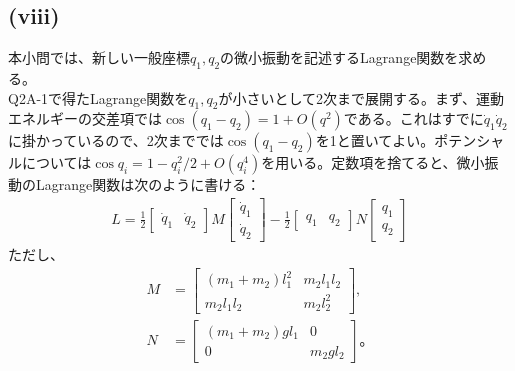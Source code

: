   \subsection*{(viii)}
  本小問では、新しい一般座標$q_1,q_2$の微小振動を記述するLagrange関数を求める。\\
  Q2A-1で得たLagrange関数を$q_1,q_2$が小さいとして2次まで展開する。まず、運動エネルギーの交差項では$\cos(q_1-q_2)=1+O(q^2)$である。これはすでに$\dot{q}_1\dot{q}_2$に掛かっているので、2次まででは$\cos(q_1-q_2)$を1と置いてよい。ポテンシャルについては$\cos q_i=1-q_i^2/2+O(q_i^4)$を用いる。定数項を捨てると、微小振動のLagrange関数は次のように書ける：
  \begin{align*}
    L=\frac{1}{2}\begin{bmatrix}\dot{q}_1&\dot{q}_2\end{bmatrix}M\begin{bmatrix}\dot{q}_1\\\dot{q}_2\end{bmatrix}-\frac{1}{2}\begin{bmatrix}q_1&q_2\end{bmatrix}N\begin{bmatrix}q_1\\q_2\end{bmatrix}\tag{94}
  \end{align*}
  ただし、
  \begin{align*}
    M&=
    \begin{bmatrix}
      (m_1+m_2)l_1^2 & m_2l_1l_2\\
      m_2l_1l_2 & m_2l_2^2
    \end{bmatrix},\tag{95}\\
    N&=
    \begin{bmatrix}
      (m_1+m_2)gl_1 & 0\\
      0 & m_2gl_2
    \end{bmatrix}。\tag{96}
  \end{align*}
  
